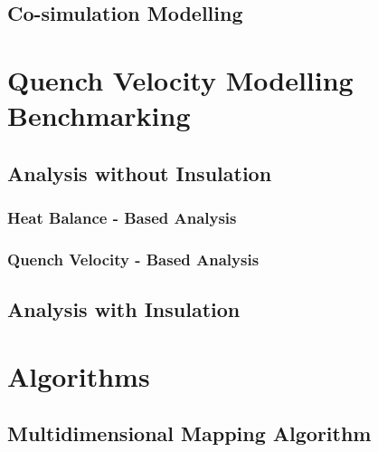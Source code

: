\documentclass{article}
\begin{document}
\subsection{Co-simulation Modelling}
\label{subsection:quench_velocity_cosimulation}


\clearpage
\section{Quench Velocity Modelling Benchmarking}
\label{section:quench_velocity_benchmarking}


\subsection{Analysis without Insulation}
\label{subsection:quench_velocity_benchmarking_no_insulation}

\subsubsection{Heat Balance - Based Analysis}


\subsubsection{Quench Velocity - Based Analysis}


\subsection{Analysis with Insulation}
\label{subsection:quench_velocity_benchmarking_with_insulation}


\clearpage
\section{Algorithms}
\label{section:algorithms}


\subsection{Multidimensional Mapping Algorithm}
\label{subsection:multidimensional_mapping_algorithm}

\end{document}
